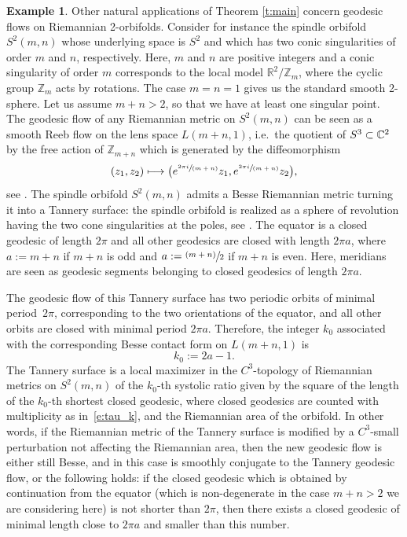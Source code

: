 \documentclass[10pt,a4paper]{amsart}
\providecommand{\ie}{i.e.\ }
\let\mathds\mathbb
\newcommand{\psfrac}[2]{\sfrac{(#1)}{#2}}
\newcommand{\spfrac}[2]{\sfrac{#1}{(#2)}}
\newcommand\mto{\mathchoice{\longmapsto}{\mapsto}{\mapsto}{\mapsto}}
\theoremstyle{definition}
\newtheorem{exm}[thm]{Example}
\newcommand{\Z}{\mathds{Z}}
\newcommand{\R}{\mathds{R}}
\providecommand{\ie}{i.e. }
\begin{document}
\begin{exm}\label{exm:besse_spindle}
Other natural applications of Theorem \ref{t:main} concern geodesic flows on Riemannian 2-orbifolds. Consider for instance the spindle orbifold $S^2(m,n)$ whose underlying space is $S^2$ and which has two conic singularities of order $m$ and $n$, respectively. Here, $m$ and $n$ are positive integers and a conic singularity of order $m$ corresponds to the local model $\R^2/\Z_m$, where the cyclic group $\Z_m$ acts by rotations. The case $m=n=1$ gives us the standard smooth 2-sphere. Let us assume $m+n>2$, so that we have at least one singular point. The geodesic flow of any Riemannian metric on $S^2(m,n)$ can be seen as a smooth Reeb flow on the lens space $L(m+n,1)$, \ie the quotient of $S^3\subset \C^2$ by the free action of $\Z_{m+n}$ which is generated by the diffeomorphism
\[
(z_1,z_2) \mto \bigl( e^{\spfrac{2\pi i}{m+n}} z_1, e^{\spfrac{2\pi i}{m+n}} z_2 \bigr),
\]
see \cite{Lange:2020}. The spindle orbifold $S^2(m,n)$ admits a Besse Riemannian metric turning it into a Tannery surface: the spindle orbifold is realized as a sphere of revolution having the two cone singularities at the poles, see \cite[Chap.\,4]{Besse:1978pr}. The equator is a closed geodesic of length $2\pi$ and all other geodesics are closed with length $2\pi a$, where $a:= m+n$ if $m+n$ is odd and $a:= \psfrac{m+n}{2}$ if $m+n$ is even. Here, meridians are seen as geodesic segments belonging to closed geodesics of length $2\pi a$.

The geodesic flow of this Tannery surface has two periodic orbits of minimal period~$2\pi$, corresponding to the two orientations of the equator, and all other orbits are closed with minimal period $2\pi a$. Therefore, the integer $k_0$ associated with the corresponding Besse contact form on $L(m+n,1)$ is
\[
k_0 := 2a -1.
\]
The Tannery surface is a local maximizer in the $C^3$-topology of Riemannian metrics on $S^2(m,n)$ of the $k_0$-th systolic ratio given by the square of the length of the $k_0$\nobreakdash-th shortest closed geodesic, where closed geodesics are counted with multiplicity as in~\eqref{e:tau_k}, and the Riemannian area of the orbifold. In other words, if the Riemannian metric of the Tannery surface is modified by a $C^3$-small perturbation not affecting the Riemannian area, then the new geodesic flow is either still Besse, and in this case is smoothly conjugate to the Tannery geodesic flow, or the following holds: if the closed geodesic which is obtained by continuation from the equator (which is non-degenerate in the case $m+n>2$ we are considering here) is not shorter than $2\pi$, then there exists a closed geodesic of minimal length close to $2\pi a$ and smaller than this number.


\end{exm}
\end{document}
